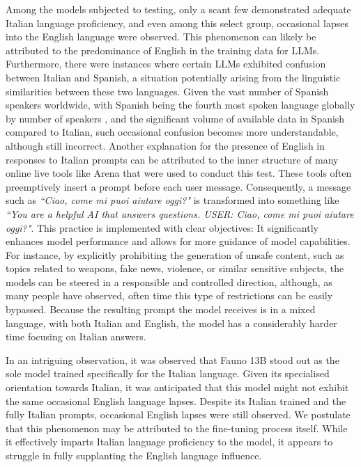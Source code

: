 Among the models subjected to testing, only a scant few demonstrated adequate Italian language proficiency, and even among this select group, occasional lapses into the English language were observed. This phenomenon can likely be attributed to the predominance of English in the training data for LLMs. Furthermore, there were instances where certain LLMs exhibited confusion between Italian and Spanish, a situation potentially arising from the linguistic similarities between these two languages. Given the vast number of Spanish speakers worldwide, with Spanish being the fourth most spoken language globally by number of speakers \cite{spanish-speakers}, and the significant volume of available data in Spanish compared to Italian, such occasional confusion becomes more understandable, although still incorrect.
Another explanation for the presence of English in responses to Italian prompts can be attributed to the inner structure of many online live tools like Arena \cite{arena} that were used to conduct this test. These tools often preemptively insert a prompt before each user message. Consequently, a message such as \emph{``Ciao, come mi puoi aiutare oggi?"} is transformed into something like \emph{``You are a helpful AI that answers questions. USER: Ciao, come mi puoi aiutare oggi?"}. This practice is implemented with clear objectives: It significantly enhances model performance and allows for more guidance of model capabilities. For instance, by explicitly prohibiting the generation of unsafe content, such as topics related to weapons, fake news, violence, or similar sensitive subjects, the models can be steered in a responsible and controlled direction, although, as many people have observed, often time this type of restrictions can be easily bypassed. Because the resulting prompt the model receives is in a mixed language, with both Italian and English, the model has a considerably harder time focusing on Italian answers.

% 
In an intriguing observation, it was observed that Fauno 13B \cite{fauno} stood out as the sole model trained specifically for the Italian language. Given its specialised orientation towards Italian, it was anticipated that this model might not exhibit the same occasional English language lapses. Despite its Italian trained and the fully Italian prompts, occasional English lapses were still observed. We postulate that this phenomenon may be attributed to the fine-tuning process itself. While it effectively imparts Italian language proficiency to the model, it appears to struggle in fully supplanting the English language influence.

